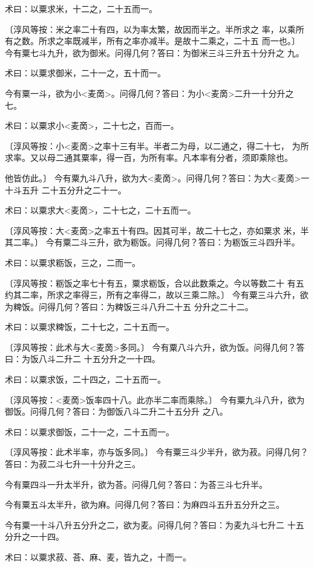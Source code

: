 \documentclass[a4paper,12pt,UTF8,twoside]{ctexbook}
\begin{document}
术曰：以粟求米，十二之，二十五而一。

〔淳风等按：米之率二十有四，以为率太繁，故因而半之。半所求之 率，以乘所有之数。所求之率既减半，所有之率亦减半。是故十二乘之，二十五 而一也。〕 今有粟七斗九升，欲为御米。问得几何？答曰：为御米三斗三升五十分升之 九。

术曰：以粟求御米，二十一之，五十而一。

今有粟一斗，欲为小<麦啇>。问得几何？答曰：为小<麦啇>二升一十分升之 七。

术曰：以粟求小<麦啇>，二十七之，百而一。

〔淳风等按：小<麦啇>之率十三有半。半者二为母，以二通之，得二十七， 为所求率。又以母二通其粟率，得一百，为所有率。凡本率有分者，须即乘除也。

他皆仿此。〕 今有粟九斗八升，欲为大<麦啇>。问得几何？答曰：为大<麦啇>一十斗五升 二十五分升之二十一。

术曰：以粟求大<麦啇>，二十七之，二十五而一。

〔淳风等按：大<麦啇>之率五十有四。因其可半，故二十七之，亦如粟求 米，半其二率。〕 今有粟二斗三升，欲为粝饭。问得几何？答曰：为粝饭三斗四升半。

术曰：以粟求粝饭，三之，二而一。

〔淳风等按：粝饭之率七十有五，粟求粝饭，合以此数乘之。今以等数二十 有五约其二率，所求之率得三，所有之率得二，故以三乘二除。〕 今有粟三斗六升，欲为粺饭。问得几何？答曰：为粺饭三斗八升二十五 分升之二十二。

术曰：以粟求粺饭，二十七之，二十五而一。

〔淳风等按：此术与大<麦啇>多同。〕 今有粟八斗六升，欲为饭。问得几何？答曰：为饭八斗二升二 十五分升之一十四。

术曰：以粟求饭，二十四之，二十五而一。

〔淳风等按：<麦啇>饭率四十八。此亦半二率而乘除。〕 今有粟九斗八升，欲为御饭。问得几何？答曰：为御饭八斗二升二十五分升 之八。

术曰：以粟求御饭，二十一之，二十五而一。

〔淳风等按：此术半率，亦与饭多同。〕 今有粟三斗少半升，欲为菽。问得几何？答曰：为菽二斗七升一十分升之三。

今有粟四斗一升太半升，欲为荅。问得几何？答曰：为荅三斗七升半。

今有粟五斗太半升，欲为麻。问得几何？答曰：为麻四斗五升五分升之三。

今有粟一十斗八升五分升之二，欲为麦。问得几何？答曰：为麦九斗七升二 十五分升之一十四。

术曰：以粟求菽、荅、麻、麦，皆九之，十而一。
\end{document}
